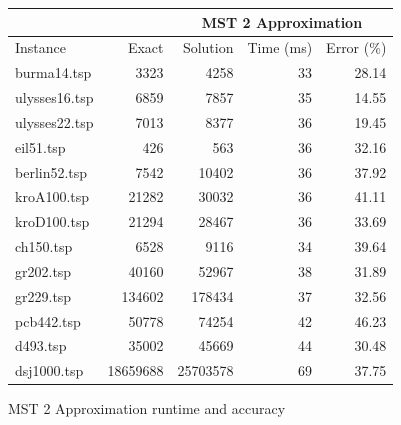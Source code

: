 \begin{figure}[H]
    \centering

    \begin{tabular}{lrrrr}
    \toprule
    \multicolumn{2}{c}{ } & \multicolumn{3}{c}{MST 2 Approximation} \\
    \hline
    Instance & Exact & Solution &   Time (ms) &   Error (\%) \\
    \hline
    burma14.tsp   &     3323 &       4258 &          33 &       28.14 \\
    ulysses16.tsp &     6859 &       7857 &          35 &       14.55 \\
    ulysses22.tsp &     7013 &       8377 &          36 &       19.45 \\
    eil51.tsp     &      426 &        563 &          36 &       32.16 \\
    berlin52.tsp  &     7542 &      10402 &          36 &       37.92 \\
    kroA100.tsp   &    21282 &      30032 &          36 &       41.11 \\
    kroD100.tsp   &    21294 &      28467 &          36 &       33.69 \\
    ch150.tsp     &     6528 &       9116 &          34 &       39.64 \\
    gr202.tsp     &    40160 &      52967 &          38 &       31.89 \\
    gr229.tsp     &   134602 &     178434 &          37 &       32.56 \\
    pcb442.tsp    &    50778 &      74254 &          42 &       46.23 \\
    d493.tsp      &    35002 &      45669 &          44 &       30.48 \\
    dsj1000.tsp   & 18659688 &   25703578 &          69 &       37.75 \\
    \bottomrule
    \end{tabular}

    \caption{MST 2 Approximation runtime and accuracy}
    \label{table:mst2approx-runtime-accuracy}
\end{figure}

